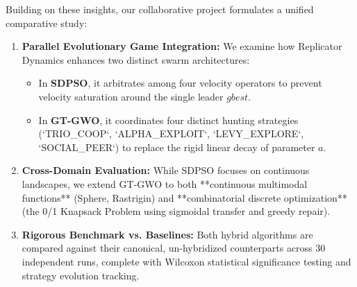 Building on these insights, our collaborative project formulates a unified comparative study:
\begin{enumerate}
    \item \textbf{Parallel Evolutionary Game Integration:} We examine how Replicator Dynamics enhances two distinct swarm architectures:
    \begin{itemize}
        \item In \textbf{SDPSO}, it arbitrates among four velocity operators to prevent velocity saturation around the single leader $gbest$.
        \item In \textbf{GT-GWO}, it coordinates four distinct hunting strategies (`TRIO\_COOP`, `ALPHA\_EXPLOIT`, `LEVY\_EXPLORE`, `SOCIAL\_PEER`) to replace the rigid linear decay of parameter $a$.
    \end{itemize}
    \item \textbf{Cross-Domain Evaluation:} While SDPSO focuses on continuous landscapes, we extend GT-GWO to both **continuous multimodal functions** (Sphere, Rastrigin) and **combinatorial discrete optimization** (the 0/1 Knapsack Problem using sigmoidal transfer and greedy repair).
    \item \textbf{Rigorous Benchmark vs. Baselines:} Both hybrid algorithms are compared against their canonical, un-hybridized counterparts across 30 independent runs, complete with Wilcoxon statistical significance testing and strategy evolution tracking.
\end{enumerate}
